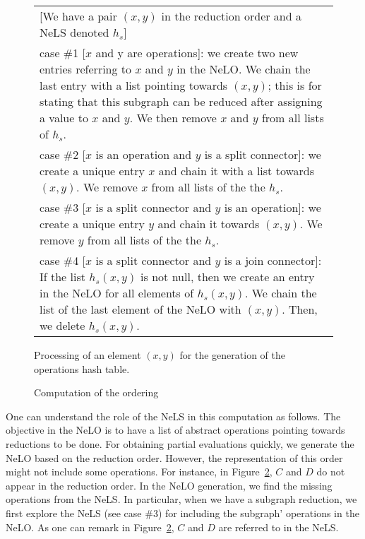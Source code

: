 \documentclass[a4paper]{article}
\begin{document}
\begin{figure}[!htbp] 
\begin{center}
\begin{tabular}{|p{13cm}|}
\hline 
\small [We have a pair $(x,y)$ in the reduction order and a NeLS denoted $h_s$]\\
\small case \#1 [$x$ and y are operations]: we create two new entries referring to $x$ and $y$ in the NeLO. 
We chain the last entry with a list pointing towards $(x,y)$; this is for stating that this subgraph 
can be reduced after assigning a value to $x$ and $y$. We then remove $x$ and $y$ from all lists of $h_s$.\\
\small case \#2 [$x$ is an operation and $y$ is a split connector]: we create a unique entry $x$ and chain it with a list 
towards $(x,y)$. We remove $x$ from all lists of the the $h_s$. \\
\small case \#3 [$x$ is a split connector and $y$ is an operation]: we create a unique entry $y$ and chain it towards 
$(x,y)$. We remove $y$ from all lists of the the $h_s$.  \\
\small case \#4 [$x$ is a split connector and $y$ is a join connector]: If the list $h_s(x,y)$ is not null, then we 
create an entry in the NeLO for all elements of $h_s(x,y)$. We chain the list of the last element of the NeLO 
with $(x,y)$. Then, we delete $h_s(x,y)$.  \\
\hline
\end{tabular}
\caption{Processing of an element $(x,y)$ for the generation of the operations hash table.}
\label{Cases}
\end{center}
\end{figure}



\begin{figure}[htbp]
\centering
{}
\caption{Computation of the ordering}\label{dataStructureExample}
\end{figure}

One can understand the role of the NeLS in this computation as follows. The objective in the NeLO 
is to have a list of abstract operations pointing towards reductions to be done. For obtaining  
 partial evaluations quickly, we generate the NeLO based on the reduction order. However, the representation of 
this order might not include some operations. For instance, in Figure~\ref{dataStructureExample}, $C$ and $D$ 
do not appear in the reduction order. In the NeLO generation, we find the missing operations from the NeLS. 
In particular, when we have a subgraph reduction, we first explore the NeLS (see case \#3) for including 
the subgraph' operations in the NeLO. As one can remark in  Figure~\ref{dataStructureExample}, $C$ and $D$ are 
referred to in the NeLS. 
\end{document}
